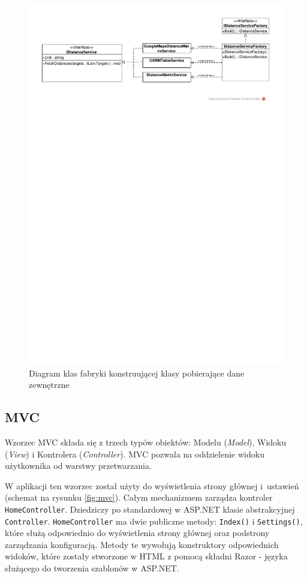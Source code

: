 \begin{figure}[htbp]
	\centering
	\includegraphics[clip, trim=1cm 23cm 1cm 1cm, width=1.00\textwidth]{uml/fabryka.pdf}
	\caption{Diagram klas fabryki konstruującej klasy pobierające dane zewnętrzne}
	\label{fig:fabryka}
\end{figure}

\subsection*{MVC}
Wzorzec MVC składa się z trzech typów obiektów: Modelu (\textit{Model}), Widoku (\textit{View}) i Kontrolera (\textit{Controller}). MVC pozwala na oddzielenie widoku użytkownika od warstwy przetwarzania. 

W aplikacji ten wzorzec został użyty do wyświetlenia strony głównej i~ustawień (schemat na rysunku \ref{fig:mvc}). Całym mechanizmem zarządza kontroler \texttt{HomeController}. Dziedziczy po standardowej w ASP.NET klasie abstrakcyjnej \texttt{Controller}. \texttt{HomeController} ma dwie publiczne metody: \texttt{Index()} i \texttt{Settings()}, które służą odpowiednio do wyświetlenia strony głównej oraz podstrony zarządzania konfiguracją. Metody te wywołują konstruktory odpowiednich widoków, które zostały stworzone w HTML z pomocą składni Razor - języka służącego do tworzenia szablonów w ASP.NET.

